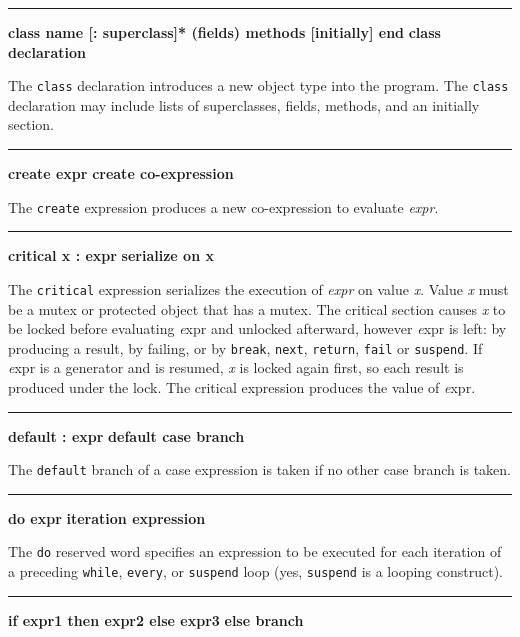 \bigskip\hrule\vspace{0.1cm}
\noindent
{\bf \textbf{class} name [: superclass]* (fields) methods [initially] end } \hfill {\bf class declaration}

\noindent
{}The \texttt{class} declaration introduces a new
object type into the program. The \texttt{class} declaration may
include lists of superclasses, fields, methods, and an
initially section.

\bigskip\hrule\vspace{0.1cm}
\noindent
{\bf create expr } \hfill {\bf create co{}-expression}

\noindent
{}The \texttt{create} expression produces a new
co-expression to evaluate \textit{expr}.

\bigskip\hrule\vspace{0.1cm}
\noindent
{\bf critical x : expr } \hfill {\bf serialize on x}

\noindent
{}The \texttt{critical} expression serializes the
execution of \textit{expr} on value {\textit x}. Value {\textit x} must
be a mutex or protected object that has a mutex. The critical section
causes {\textit x} to be locked before evaluating {\textit expr} and
unlocked afterward, however {\textit expr} is left: by producing a result,
by failing, or by \texttt{break}, \texttt{next}, \texttt{return},
\texttt{fail} or \texttt{suspend}. If {\textit expr} is a generator and is
resumed, {\textit x} is locked again first, so each result is produced
under the lock. The critical expression produces the value of {\textit expr}.

\bigskip\hrule\vspace{0.1cm}
\noindent
{\bf default : expr } \hfill {\bf default case branch}

\noindent
{}The \texttt{default} branch of a case
expression is taken if no other case branch is taken.

\bigskip\hrule\vspace{0.1cm}
\noindent
{\bf do expr } \hfill {\bf iteration expression}

\noindent
{}The \texttt{do} reserved word specifies an
expression to be executed for each iteration of a preceding
\texttt{while}, \texttt{every}, or \texttt{suspend} loop (yes,
\texttt{suspend} is a looping construct).

\bigskip\hrule\vspace{0.1cm}
\noindent
{\bf if expr1 then expr2 else expr3 } \hfill {\bf else branch}

